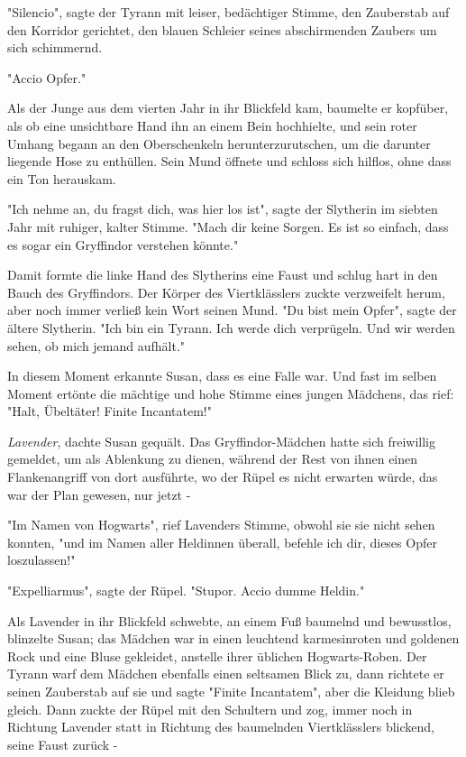 {"Silencio", sagte der Tyrann mit leiser, bedächtiger Stimme, den Zauberstab auf den Korridor gerichtet, den blauen Schleier seines abschirmenden Zaubers um sich schimmernd.

"Accio Opfer."

Als der Junge aus dem vierten Jahr in ihr Blickfeld kam, baumelte er kopfüber, als ob eine unsichtbare Hand ihn an einem Bein hochhielte, und sein roter Umhang begann an den Oberschenkeln herunterzurutschen, um die darunter liegende Hose zu enthüllen. Sein Mund öffnete und schloss sich hilflos, ohne dass ein Ton herauskam.

"Ich nehme an, du fragst dich, was hier los ist", sagte der Slytherin im siebten Jahr mit ruhiger, kalter Stimme. "Mach dir keine Sorgen. Es ist so einfach, dass es sogar ein Gryffindor verstehen könnte."

Damit formte die linke Hand des Slytherins eine Faust und schlug hart in den Bauch des Gryffindors. Der Körper des Viertklässlers zuckte verzweifelt herum, aber noch immer verließ kein Wort seinen Mund. "Du bist mein Opfer", sagte der ältere Slytherin. "Ich bin ein Tyrann. Ich werde dich verprügeln. Und wir werden sehen, ob mich jemand aufhält."

In diesem Moment erkannte Susan, dass es eine Falle war. Und fast im selben Moment ertönte die mächtige und hohe Stimme eines jungen Mädchens, das rief: "Halt, Übeltäter! Finite Incantatem!"

\emph{Lavender}, dachte Susan gequält. Das Gryffindor-Mädchen hatte sich freiwillig gemeldet, um als Ablenkung zu dienen, während der Rest von ihnen einen Flankenangriff von dort ausführte, wo der Rüpel es nicht erwarten würde, das war der Plan gewesen, nur jetzt -

"Im Namen von Hogwarts", rief Lavenders Stimme, obwohl sie sie nicht sehen konnten, "und im Namen aller Heldinnen überall, befehle ich dir, dieses Opfer loszulassen!"

"Expelliarmus", sagte der Rüpel. "Stupor. Accio dumme Heldin."

Als Lavender in ihr Blickfeld schwebte, an einem Fuß baumelnd und bewusstlos, blinzelte Susan; das Mädchen war in einen leuchtend karmesinroten und goldenen Rock und eine Bluse gekleidet, anstelle ihrer üblichen Hogwarts-Roben. Der Tyrann warf dem Mädchen ebenfalls einen seltsamen Blick zu, dann richtete er seinen Zauberstab auf sie und sagte "Finite Incantatem", aber die Kleidung blieb gleich. Dann zuckte der Rüpel mit den Schultern und zog, immer noch in Richtung Lavender statt in Richtung des baumelnden Viertklässlers blickend, seine Faust zurück -

}
